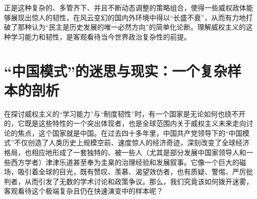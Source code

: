 \documentclass[UTF8, 10pt]{ctexbook}
\begin{document}
正是这种复杂的、多管齐下、并且不断动态调整的策略组合，使得一些威权政体能够展现出惊人的韧性，在风云变幻的国内外环境中得以“长盛不衰”，从而有力地打破了那种认为“民主是历史发展的唯一必然方向”的简单化论断。理解威权主义的这种学习能力和韧性，是客观看待当今世界政治复杂性的前提。

\section{“中国模式”的迷思与现实：一个复杂样本的剖析}
\lettrine[lines=2]{在}{探讨}威权主义的“学习能力”与“制度韧性”时，有一个国家是无论如何也绕不开的，它既是这些特性的一个突出体现者，也是全球范围内关于威权主义未来走向讨论的焦点，这个国家就是中国。在过去四十多年里，中国共产党领导下的“中国模式”不仅创造了人类历史上规模空前、速度惊人的经济奇迹，深刻改变了全球经济格局，也相应地形成了一套独特的、被一些人（尤其是部分发展中国家领导人和一些西方学者）津津乐道甚至奉为圭臬的治理经验和发展叙事。它像一个巨大的磁场，吸引着全球的目光，既有赞叹、羡慕、渴望效仿者，也有质疑、警惕、严厉批判者，从而引发了无数的学术讨论和政策争议。那么，我们究竟该如何拨开迷雾，客观看待这个极端复杂且仍在快速演变中的样本呢？
\end{document}
